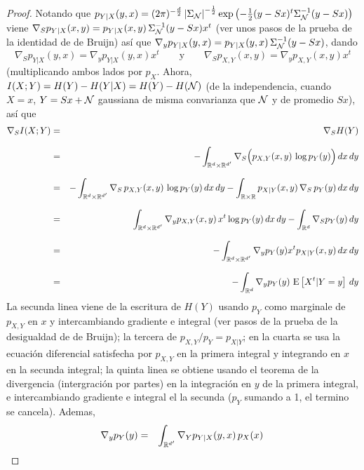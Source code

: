 %
\begin{proof}
  Notando  que  $p_{Y|X} (y,x)  =  (2  \pi)^{-\frac{d}{2}} \left|  \Sigma_{\mathcal{N}}
  \right|^{-\frac12}  \exp\left( -\frac12  (y-S  x)^t \Sigma_{\mathcal{N}}^{-1}  (y-Sx)
  \right)$ viene $\nabla_S p_{Y|X}(x,y)  = p_{Y|X}(x,y) \, \Sigma_{\mathcal{N}}^{-1} (y
  - S x) x^t$  (ver unos pasos de la prueba de la  identidad de de Bruijn) as\'i
  que $\nabla_y  p_{Y|X}(y,x) = p_{Y|X}(y,x)  \, \Sigma_{\mathcal{N}}^{-1} (y -  S x)$,
  dando
  \[
  \nabla_S  p_{Y|X}(y,x)  = \nabla_y  p_{Y|X}(y,x)  x^t  \qquad \mbox{y}  \qquad
  \nabla_S p_{X,Y}(x,y) = \nabla_y p_{X,Y}(x,y) x^t
  \]
  (multiplicando ambos lados por $p_X$. Ahora,  $I(X;Y) = H(Y) - H(Y|X) = H(Y) -
  H(\mathcal{N})$ (de la independencia, cuando $X =  x$, $Y = S x + \mathcal{N}$ gaussiana
  de misma convarianza que $\mathcal{N}$ y de promedio $S x$), as\'i que
  \begin{eqnarray*}
  \nabla_S I(X;Y) & = & \nabla_S H(Y)\\[2.5mm]
  & = & - \int_{\mathbb{R}^d \times \mathbb{R}^{d'}} \nabla_S \Big( p_{X,Y}(x,y) \, \log
  p_Y(y) \Big) \, dx \, dy\\[2.5mm]
  & = & - \int_{\mathbb{R}^d \times \mathbb{R}^{d'}} \nabla_S \, p_{X,Y}(x,y) \, \log p_Y(y) \,
  dx \, dy - \int_{\mathbb{R} \times \mathbb{R}} p_{X|Y}(x,y) \, \nabla_S \, p_Y(y) \, dx \,
  dy\\[2.5mm]
  & = & \int_{\mathbb{R}^d \times \mathbb{R}^{d'}} \nabla_y p_{X,Y}(x,y) \, x^t \log p_Y(y)
  \, dx \, dy - \int_{\mathbb{R}^d} \nabla_S p_Y(y) \, dy\\[2.5mm]
  & = & - \int_{\mathbb{R}^d \times \mathbb{R}^{d'}} \nabla_y p_Y(y) x^t p_{X|Y}(x,y) \, dx
  \, dy\\[2.5mm]
  & = & - \int_{\mathbb{R}^d} \nabla_y p_Y(y) \, \operatorname{E}\left[X^t | Y = y \right] \, dy
  \end{eqnarray*}
  La secunda linea  viene de la escritura de $H(Y)$  usando $p_Y$ como marginale
  de $p_{X,Y}$  en $x$ y  intercambiando gradiente e  integral (ver pasos  de la
  prueba de la desigualdad de de Bruijn); la tercera de $p_{X,Y}/p_Y = p_{X|Y}$;
  en la cuarta  se usa la ecuaci\'on diferencial satisfecha  por $p_{X,Y}$ en la
  primera integral y  integrando en $x$ en la secunda  integral; la quinta linea
  se obtiene usando el teorema  de la divergencia (intergraci\'on por partes) en
  la integraci\'on en  $y$ de la primera integral,  e intercambiando gradiente e
  integral el la secunda ($p_Y$ sumando a 1, el termino se cancela). Ademas,
  \begin{eqnarray*}
  \nabla_y p_Y(y) & = & \int_{\Rset^{d'}} \nabla_Y p_{Y|X}(y,x) \, p_X(x) \,

\end{eqnarray*}
\end{proof}
